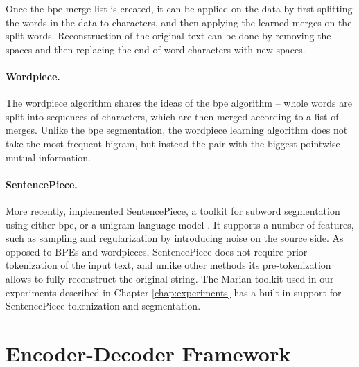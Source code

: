 Once the \ac{bpe} merge list is created, it can be applied on the data by first
splitting the words in the data to characters, and then applying the learned
merges on the split words. Reconstruction of the original text can be done by
removing the spaces and then replacing the end-of-word characters with new
spaces.

\paragraph{Wordpiece.} The wordpiece algorithm
\citep{schuster-nakajima-2012-japanese,wu2016google} shares the ideas of the
\ac{bpe} algorithm -- whole words are split into sequences of characters, which
are then merged according to a list of merges. Unlike the \ac{bpe}
segmentation, the wordpiece learning algorithm does not take the most frequent
bigram, but instead the pair with the biggest pointwise mutual
information. 


\paragraph{SentencePiece.} More recently,
\citet{kudo-richardson-2018-sentencepiece} implemented SentencePiece, a toolkit
for subword segmentation using either \ac{bpe}, or a unigram language model
\citep{kudo-2018-subword}. It supports a number of features, such as sampling
and regularization by introducing noise on the source side. As opposed to BPEs
and wordpieces, SentencePiece does not require prior tokenization of the input
text, and unlike other methods its pre-tokenization allows to fully reconstruct
the original string. The Marian toolkit
\citep{junczys-dowmunt-etal-2018-marian} used in our experiments described in
Chapter \ref{chap:experiments} has a built-in support for SentencePiece
tokenization and segmentation.

\section{Encoder-Decoder Framework}
\label{sec:encdec}

